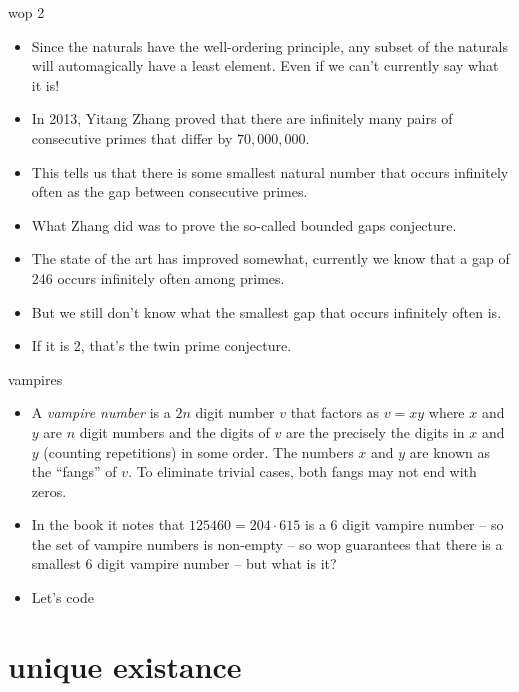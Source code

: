 \documentclass[landscape]{beamer}
\begin{document}
\begin{frame}{wop 2}
\begin{itemize}
\item Since the naturals have the well-ordering principle, any subset of the naturals will automagically have a least element. \pause Even if we can't currently say what it is! \pause
\item In 2013, Yitang Zhang proved that there are infinitely many pairs of consecutive primes that differ by $70,\!000,\!000$. \pause
\item This tells us that there is some smallest natural number that occurs infinitely often as the gap between consecutive primes. \pause
\item What Zhang did was to prove the so-called bounded gaps conjecture. \pause
\item The state of the art has improved somewhat, currently we know that a gap of $246$ occurs infinitely often among primes.  \pause
\item But we still don't know what the smallest gap that occurs infinitely often is. \pause
\item If it is 2, that's the twin prime conjecture. 
\end{itemize}
\end{frame}

\begin{frame}{vampires}
\begin{itemize}
\item A \emph{vampire number} 
is a 
$2n$ digit number $v$ that factors as $v=xy$
where $x$ and $y$ are $n$ digit numbers and the digits of $v$ are the 
precisely the digits in $x$ and $y$ (counting repetitions) in some order.  The numbers $x$ and $y$
are known as the ``fangs'' of $v$.  To eliminate trivial
cases, both fangs may not end with zeros. \pause
\item In the book it notes that $125460 = 204 \cdot 615 $ is a 6 digit vampire number \pause \newline
-- so the set of vampire numbers is non-empty \pause \newline
-- so wop guarantees that there is a smallest 6 digit vampire number \pause \newline
-- but what is it? \pause
\item Let's code\textellipsis  
\end{itemize}
\end{frame}

\section{unique existance}
\end{document}
